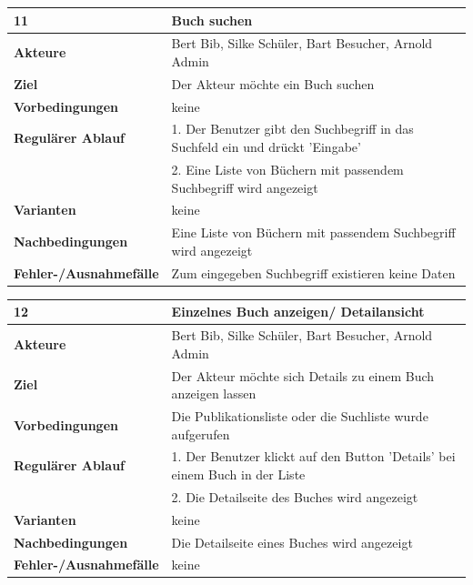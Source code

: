 \documentclass[fontsize=12pt,paper=a4,twoside]{scrartcl}
\begin{document}
\begin{table}[htbp]
\label{11}
\begin{tabular}{|l|p{10cm}|}
\hline 
\textbf{11} & \textbf{Buch suchen} \\ \hline
\textbf{Akteure} & Bert Bib, Silke Schüler, Bart Besucher, Arnold Admin\\ \hline
\textbf{Ziel} & Der Akteur möchte ein Buch suchen \\ \hline
\textbf{Vorbedingungen} & keine \\ \hline
\textbf{Regulärer Ablauf} & 
1. Der Benutzer gibt den Suchbegriff in das Suchfeld ein und drückt 'Eingabe' \\
&2. Eine Liste von Büchern mit passendem Suchbegriff wird angezeigt\\
\hline
\textbf{Varianten} & 
keine \\ \hline
\textbf{Nachbedingungen} & Eine Liste von Büchern mit passendem Suchbegriff wird angezeigt\\ \hline
\textbf{Fehler-/Ausnahmefälle} & Zum eingegeben Suchbegriff existieren keine Daten\\
\hline
\end{tabular}
\end{table}

\begin{table}[htbp]
\label{12}
\begin{tabular}{|l|p{10cm}|}
\hline 
\textbf{12} & \textbf{Einzelnes Buch anzeigen/ Detailansicht} \\ \hline
\textbf{Akteure} & Bert Bib, Silke Schüler, Bart Besucher, Arnold Admin\\ \hline
\textbf{Ziel} & Der Akteur möchte sich Details zu einem Buch anzeigen lassen \\ \hline
\textbf{Vorbedingungen} & Die Publikationsliste oder die Suchliste wurde aufgerufen \\ \hline
\textbf{Regulärer Ablauf} & 
1. Der Benutzer klickt auf den Button 'Details' bei einem Buch in der Liste \\
&2. Die Detailseite des Buches wird angezeigt\\
\hline
\textbf{Varianten} & 
keine \\ \hline
\textbf{Nachbedingungen} & Die Detailseite eines Buches wird angezeigt\\ \hline
\textbf{Fehler-/Ausnahmefälle} & keine\\
\hline
\end{tabular}
\end{table}
\end{document}
